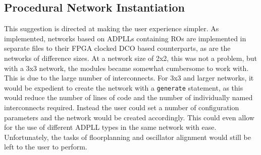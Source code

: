 \subsection{Procedural Network Instantiation}
This suggestion is directed at making the user experience simpler. As implemented, networks based on \ac{ADPLL}s containing \ac{RO}s are implemented in separate files to their \ac{FPGA} clocked \ac{DCO} based counterparts, as are the networks of difference sizes. At a network size of 2x2, this was not a problem, but with a 3x3 network, the modules became somewhat cumbersome to work with. This is due to the large number of interconnects. For 3x3 and larger networks, it would be expedient to create the network with a \texttt{generate} statement, as this would reduce the number of lines of code and the number of individually named interconnects required. Instead the user could set a number of configuration parameters and the network would be created accordingly. This could even allow for the use of different \ac{ADPLL} types in the same network with ease. Unfortunately, the tasks of floorplanning and oscillator alignment would still be left to the user to perform.
